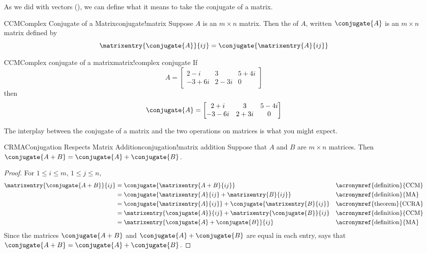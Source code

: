 %
%
As we did with vectors (), we can define what it means to take the conjugate of a matrix.
%
\begin{definition}{CCM}{Complex Conjugate of a Matrix}{conjugate!matrix}
Suppose $A$ is an $m\times n$ matrix.  Then the  of $A$, written $\conjugate{A}$ is an $m\times n$ matrix defined by
%
\begin{equation*}
\matrixentry{\conjugate{A}}{ij}=\conjugate{\matrixentry{A}{ij}}
\end{equation*}
%
\end{definition}
%
%
\begin{example}{CCM}{Complex conjugate of a matrix}{matrix!complex conjugate}
If 
%
\begin{equation*}
A=
\begin{bmatrix}
2-i & 3 & 5+4i\\
-3+6i & 2-3i & 0
\end{bmatrix}
\end{equation*}
%
then
%
\begin{equation*}
\conjugate{A}=
\begin{bmatrix}
2+i & 3 & 5-4i\\
-3-6i & 2+3i & 0
\end{bmatrix}
\end{equation*}
%
\end{example}
%
The interplay between the conjugate of a matrix and the two operations on matrices is what you might expect.
%
\begin{theorem}{CRMA}{Conjugation Respects Matrix Addition}{conjugation!matrix addition}
Suppose that $A$ and $B$ are $m\times n$ matrices.  Then $\conjugate{A+B}=\conjugate{A}+\conjugate{B}$.
\end{theorem}
%
\begin{proof}
%
For $1\leq i\leq m$, $1\leq j\leq n$,
%
\begin{align*}
%
\matrixentry{\conjugate{A+B}}{ij}
&=\conjugate{\matrixentry{A+B}{ij}}&&\text{\acronymref{definition}{CCM}}\\
&=\conjugate{\matrixentry{A}{ij}+\matrixentry{B}{ij}}&&\text{\acronymref{definition}{MA}}\\
&=\conjugate{\matrixentry{A}{ij}}+\conjugate{\matrixentry{B}{ij}}&&\text{\acronymref{theorem}{CCRA}}\\
&=\matrixentry{\conjugate{A}}{ij}+\matrixentry{\conjugate{B}}{ij}&&\text{\acronymref{definition}{CCM}}\\
&=\matrixentry{\conjugate{A}+\conjugate{B}}{ij}&&\text{\acronymref{definition}{MA}}
%
\end{align*}
%
Since the matrices  $\conjugate{A+B}$ and $\conjugate{A}+\conjugate{B}$  are equal in each entry,  says that $\conjugate{A+B}=\conjugate{A}+\conjugate{B}$.
%
\end{proof}
